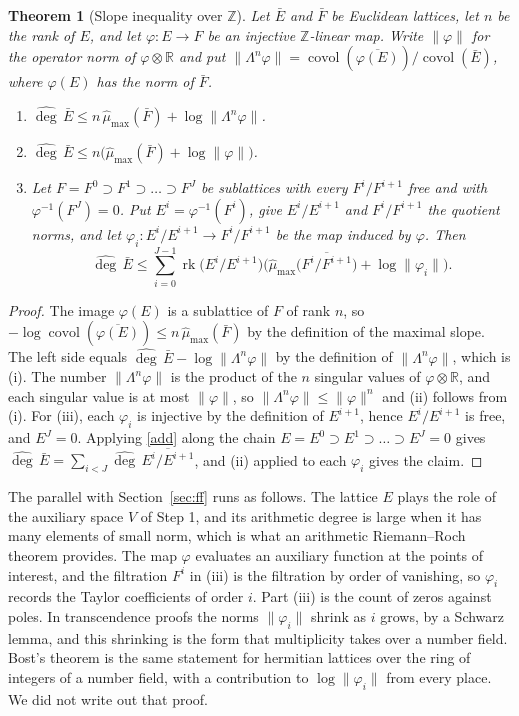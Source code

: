 \documentclass[11pt,letterpaper]{article}
\newtheorem{theorem}{Theorem}[section]
\numberwithin{equation}{section}
\begin{document}
\begin{theorem}[Slope inequality over $\mathbb Z$]\label{slope}
Let $\bar E$ and $\bar F$ be Euclidean lattices, let $n$ be the rank of $E$, and let $\varphi\colon E\to F$ be an injective $\mathbb Z$-linear map. Write $\|\varphi\|$ for the operator norm of $\varphi\otimes\mathbb R$ and put $\|\Lambda^n\varphi\|=\operatorname{covol}(\overline{\varphi(E)})/\operatorname{covol}(\bar E)$, where $\varphi(E)$ has the norm of $\bar F$.
\begin{enumerate}
\item[(i)] $\widehat{\deg}\,\bar E\le n\,\hat\mu_{\max}(\bar F)+\log\|\Lambda^n\varphi\|$.
\item[(ii)] $\widehat{\deg}\,\bar E\le n\big(\hat\mu_{\max}(\bar F)+\log\|\varphi\|\big)$.
\item[(iii)] Let $F=F^0\supset F^1\supset\dots\supset F^J$ be sublattices with every $F^i/F^{i+1}$ free and with $\varphi^{-1}(F^J)=0$. Put $E^i=\varphi^{-1}(F^i)$, give $E^i/E^{i+1}$ and $F^i/F^{i+1}$ the quotient norms, and let $\varphi_i\colon E^i/E^{i+1}\to F^i/F^{i+1}$ be the map induced by $\varphi$. Then
\[
\widehat{\deg}\,\bar E\le\sum_{i=0}^{J-1}\operatorname{rk}\big(E^i/E^{i+1}\big)\Big(\hat\mu_{\max}\big(\overline{F^i/F^{i+1}}\big)+\log\|\varphi_i\|\Big).
\]
\end{enumerate}
\end{theorem}
\begin{proof}
The image $\varphi(E)$ is a sublattice of $F$ of rank $n$, so $-\log\operatorname{covol}(\overline{\varphi(E)})\le n\,\hat\mu_{\max}(\bar F)$ by the definition of the maximal slope. The left side equals $\widehat{\deg}\,\bar E-\log\|\Lambda^n\varphi\|$ by the definition of $\|\Lambda^n\varphi\|$, which is (i). The number $\|\Lambda^n\varphi\|$ is the product of the $n$ singular values of $\varphi\otimes\mathbb R$, and each singular value is at most $\|\varphi\|$, so $\|\Lambda^n\varphi\|\le\|\varphi\|^n$ and (ii) follows from (i). For (iii), each $\varphi_i$ is injective by the definition of $E^{i+1}$, hence $E^i/E^{i+1}$ is free, and $E^J=0$. Applying \eqref{add} along the chain $E=E^0\supset E^1\supset\dots\supset E^J=0$ gives $\widehat{\deg}\,\bar E=\sum_{i<J}\widehat{\deg}\,\overline{E^i/E^{i+1}}$, and (ii) applied to each $\varphi_i$ gives the claim.
\end{proof}

The parallel with Section~\ref{sec:ff} runs as follows. The lattice $E$ plays the role of the auxiliary space $V$ of Step 1, and its arithmetic degree is large when it has many elements of small norm, which is what an arithmetic Riemann--Roch theorem provides. The map $\varphi$ evaluates an auxiliary function at the points of interest, and the filtration $F^i$ in (iii) is the filtration by order of vanishing, so $\varphi_i$ records the Taylor coefficients of order $i$. Part (iii) is the count of zeros against poles. In transcendence proofs the norms $\|\varphi_i\|$ shrink as $i$ grows, by a Schwarz lemma, and this shrinking is the form that multiplicity takes over a number field. Bost's theorem \cite{bost} is the same statement for hermitian lattices over the ring of integers of a number field, with a contribution to $\log\|\varphi_i\|$ from every place. We did not write out that proof.
\end{document}
